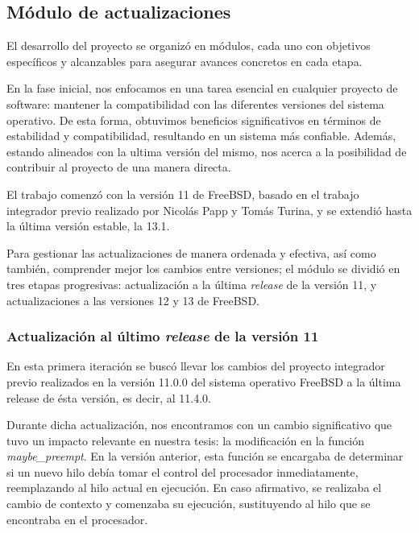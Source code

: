 \subsection{Módulo de actualizaciones}

El desarrollo del proyecto se organizó en módulos, cada uno con objetivos específicos y alcanzables para asegurar avances concretos en cada etapa.\par

En la fase inicial, nos enfocamos en una tarea esencial en cualquier proyecto de software: mantener la compatibilidad con las diferentes versiones del sistema operativo. De esta forma, obtuvimos beneficios significativos en términos de estabilidad y compatibilidad, resultando en un sistema más confiable. Además, estando alineados con la ultima versión del mismo, nos acerca a la posibilidad de contribuir al proyecto de una manera directa.\par

El trabajo comenzó con la versión 11 de FreeBSD, basado en el trabajo integrador previo realizado por Nicolás Papp y Tomás Turina, y se extendió hasta la última versión estable, la 13.1.\par

Para gestionar las actualizaciones de manera ordenada y efectiva, así como también, comprender mejor los cambios entre versiones; el módulo se dividió en tres etapas progresivas: actualización a la última \textit{release} de la versión 11, y actualizaciones a las versiones 12 y 13 de FreeBSD.\par


\subsubsection{Actualización al último \textit{release} de la versión 11}

En esta primera iteración se buscó llevar los cambios del proyecto integrador previo realizados en la versión 11.0.0 del sistema operativo FreeBSD a la última release de ésta versión, es decir, al 11.4.0.\par

Durante dicha actualización, nos encontramos con un cambio significativo que tuvo un impacto relevante en nuestra tesis: la modificación en la función \textit{maybe\_preempt}. En la versión anterior, esta función se encargaba de determinar si un nuevo hilo debía tomar el control del procesador inmediatamente, reemplazando al hilo actual en ejecución. En caso afirmativo, se realizaba el cambio de contexto y comenzaba su ejecución, sustituyendo al hilo que se encontraba en el procesador.\par

